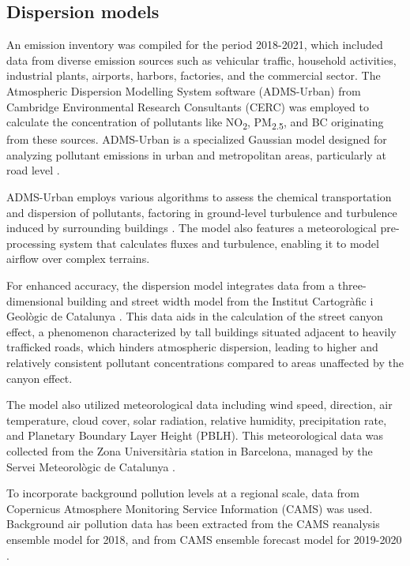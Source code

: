 \documentclass{article}
\begin{document}
\subsection{Dispersion models}

An emission inventory was compiled for the period 2018-2021, which included data from diverse emission sources such as vehicular traffic, household activities, industrial plants, airports, harbors, factories, and the commercial sector. The Atmospheric Dispersion Modelling System software (ADMS-Urban) from Cambridge Environmental Research Consultants (CERC) was employed to calculate the concentration of pollutants like NO\textsubscript{2}, PM\textsubscript{2.5}, and BC originating from these sources. ADMS-Urban is a specialized Gaussian model designed for analyzing pollutant emissions in urban and metropolitan areas, particularly at road level \cite{mchugh1997adms}.

ADMS-Urban employs various algorithms to assess the chemical transportation and dispersion of pollutants, factoring in ground-level turbulence and turbulence induced by surrounding buildings \cite{stocker2012adms}. The model also features a meteorological pre-processing system that calculates fluxes and turbulence, enabling it to model airflow over complex terrains.

For enhanced accuracy, the dispersion model integrates data from a three-dimensional building and street width model from the Institut Cartogràfic i Geològic de Catalunya \cite{stoter2016state, 3Dcity}. This data aids in the calculation of the street canyon effect, a phenomenon characterized by tall buildings situated adjacent to heavily trafficked roads, which hinders atmospheric dispersion, leading to higher and relatively consistent pollutant concentrations compared to areas unaffected by the canyon effect.

The model also utilized meteorological data including wind speed, direction, air temperature, cloud cover, solar radiation, relative humidity, precipitation rate, and Planetary Boundary Layer Height (PBLH). This meteorological data was collected from the Zona Universitària station in Barcelona, managed by the Servei Meteorològic de Catalunya \cite{xema2013}.

To incorporate background pollution levels at a regional scale, data from Copernicus Atmosphere Monitoring Service Information (CAMS) was used. Background air pollution data has been extracted from the CAMS reanalysis ensemble model for 2018, and from CAMS ensemble forecast model for 2019-2020 \cite{cams2020, franceinstitut}. 
\end{document}
